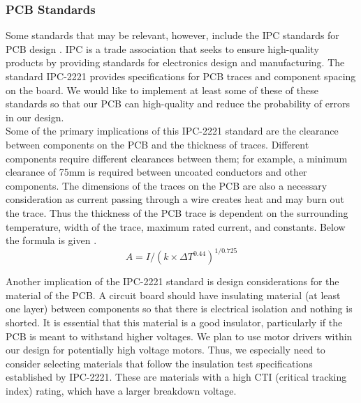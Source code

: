 \subsubsection{PCB Standards}
\noindent Some standards that may be relevant, however, include the IPC standards for PCB design \cite{ipc2221}. IPC is a trade association that seeks to ensure high-quality products by providing standards for electronics design and manufacturing. The standard IPC-2221 provides specifications for PCB traces and component spacing on the board. We would like to implement at least some of these of these standards so that our PCB can high-quality and reduce the probability of errors in our design. \\ 

\noindent Some of the primary implications of this IPC-2221 standard are the clearance between components on the PCB and the thickness of traces. Different components require different clearances between them; for example, a minimum clearance of 75mm is required between uncoated conductors and other components. The dimensions of the traces on the PCB are also a necessary consideration as current passing through a wire creates heat and may burn out the trace. Thus the thickness of the PCB trace is dependent on the surrounding temperature, width of the trace, maximum rated current, and constants. Below the formula is given \cite{ipc2221}. \\

\noindent \[A = I / ({k \times \Delta T ^ {0.44}}) ^ {1/0.725}\]

\noindent Another implication of the IPC-2221 standard is design considerations for the material of the PCB. A circuit board should have insulating material (at least one layer) between components so that there is electrical isolation and nothing is shorted. It is essential that this material is a good insulator, particularly if the PCB is meant to withstand higher voltages. We plan to use motor drivers within our design for potentially high voltage motors. Thus, we especially need to consider selecting materials that follow the insulation test specifications established by IPC-2221. These are materials with a high CTI (critical tracking index) rating, which have a larger breakdown voltage.\\


